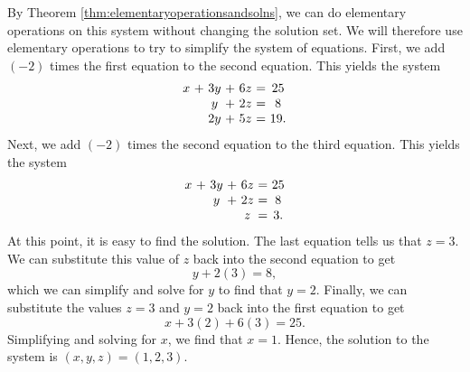 \begin{solution}
  By Theorem \ref{thm:elementaryoperationsandsolns}, we can do
  elementary operations on this system without changing the solution
  set. We will therefore use elementary operations to try to simplify
  the system of equations.  First, we add $\left( -2\right)$ times the
  first equation to the second equation. This yields the system
  \begin{equation*}
    \begin{array}{c@{~}c@{~}c@{~}c@{~}c@{~}c@{~}c}
      x&+&3y&+&6z&=&25 \\
       &&y&+&2z&=&8 \\
       &&2y&+&5z&=&19.
    \end{array}
    \label{solvingasystem2}
  \end{equation*}
  Next, we add $\left(-2\right)$ times the second equation to the
  third equation. This yields the system
  \begin{equation}
    \begin{array}{c@{~}c@{~}c@{~}c@{~}c@{~}c@{~}c}
      x&+&3y&+&6z&=&25 \\
      &&y&+&2z&=&8 \\
      &&&&z&=&3.
    \end{array}
    \label{solvingasystem3}
  \end{equation}
  At this point, it is easy to find the solution. The last equation
  tells us that $z=3$. We can substitute this value of $z$ back into
  the second equation to get
  \begin{equation*}
    y+2(3)=8,
  \end{equation*}
  which we can simplify and solve for $y$ to find that $y=2$. Finally,
  we can substitute the values $z=3$ and $y=2$ back into the first
  equation to get
  \begin{equation*}
    x+3(2)+6(3)=25.
  \end{equation*}
  Simplifying and solving for $x$, we find that $x=1$. Hence, the
  solution to the system is $(x,y,z)=(1,2,3)$.


\end{solution}
